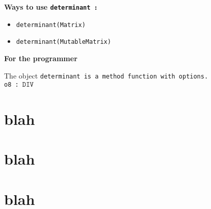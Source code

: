 \documentclass[12pt,a4paper]{amsart}
\begin{document}
\par \medskip\noindent\begingroup\Large\bf
Ways to use \begingroup\tt determinant\endgroup{} :\endgroup
\par \smallskip%
\begin{itemize}
\item \begingroup\tt {}determinant(Matrix){}\endgroup{}
\item \begingroup\tt {}determinant(MutableMatrix){}\endgroup{}
\end{itemize}

\par \medskip\noindent\begingroup\Large\bf
For the programmer\endgroup
\par \smallskip%

\par The object \begingroup\tt determinant\endgroup{} is a \begingroup\tt method\ function\ with\ options\endgroup{}.
\\
\verb|o8 : |$\texttt{DIV}$
\smallskip



\section{blah}
\section{blah}
\section{blah}
\end{document}

